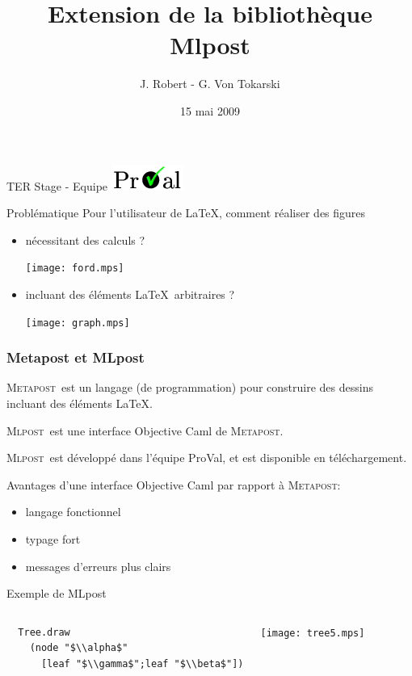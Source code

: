 \documentclass{beamer}
\title{Extension de la bibliothèque Mlpost}
\author{J. Robert - G. Von Tokarski}
\date{15 mai 2009}
\newcommand{\mlpost}{\textsc{Mlpost}}
\newcommand{\meta}{\textsc{Metapost}}
\begin{document}
\begin{frame}
  \maketitle

  \begin{center}
    TER Stage - Equipe \includegraphics[scale=0.4]{proval.png}
  \end{center}
\end{frame}

\begin{frame}{Problématique}
  Pour l'utilisateur de \LaTeX, comment réaliser des figures
  \begin{itemize}
  \item nécessitant des calculs ?
  \begin{center}
    \texttt{[image: ford.mps]}
  \end{center}

  \bigskip
  \item incluant des éléments \LaTeX\ arbitraires ?
    \bigskip
    \begin{center}
      \texttt{[image: graph.mps]}
    \end{center}
  \end{itemize}
\end{frame}

\begin{frame}[fragile]\frametitle{Metapost et MLpost}
  \meta\ est un langage (de programmation) pour construire des dessins incluant des éléments \LaTeX.

  \bigskip
  \mlpost\ est une interface Objective Caml de \meta.

  \mlpost\ est développé dans l'équipe ProVal, et est disponible en téléchargement. 
  \bigskip

  Avantages d'une interface Objective Caml par rapport à \meta:
  \begin{itemize}
  \item langage fonctionnel
  \item typage fort
  \item messages d'erreurs plus clairs
  \end{itemize}

\end{frame}

\begin{frame}[fragile]{Exemple de MLpost}  
  \begin{columns}
    \small
    \begin{verbatim}
  Tree.draw 
    (node "$\\alpha$" 
      [leaf "$\\gamma$";leaf "$\\beta$"])
    \end{verbatim}
    \texttt{[image: tree5.mps]}
  \end{columns}
\end{frame}
\end{document}
